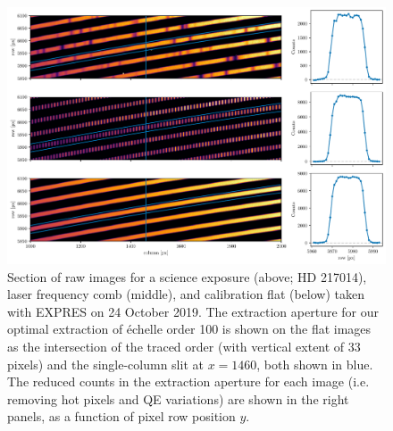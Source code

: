 \begin{figure}
    \centering
    \includegraphics[width=\textwidth]{figures-4/extraction.pdf}
    \caption[EXPRES order cross-sections]{Section of raw images for a science exposure (above; HD 217014), laser frequency comb (middle), and calibration flat (below) taken with EXPRES on 24 October 2019. The extraction aperture for our optimal extraction of \'echelle order 100 is shown on the flat images as the intersection of the traced order (with vertical extent of 33 pixels) and the single-column slit at $x = 1460$, both shown in blue. The reduced counts in the extraction aperture for each image (i.e. removing hot pixels and QE variations) are shown in the right panels, as a function of pixel row position $y$.}
    \label{fig:extraction}
\end{figure}

